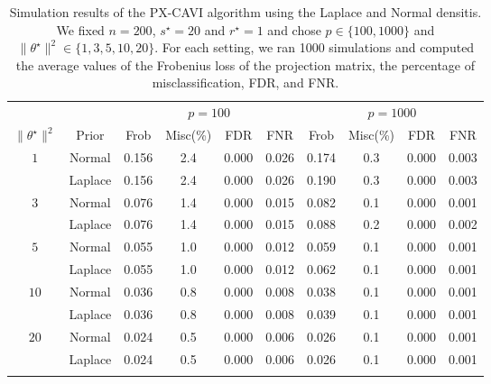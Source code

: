 \documentclass[pdftex, noinfoline, letter]{imsart}
\theoremstyle{plain}
\begin{document}
\begin{table}[h!]
\begin{adjustwidth}{-.1in}{-.1in}  
\centering
\caption{\small Simulation results of the PX-CAVI algorithm using the Laplace and Normal densitis. We fixed $n = 200$, $s^\star = 20$ and $r^\star = 1$ and chose $p \in \{100, 1000\}$ and $\|\theta^\star\|^2 \in \{1, 3, 5, 10, 20\}$. For each setting, we ran 1000 simulations and computed the average values of the Frobenius loss of the projection matrix, the percentage of misclassification, FDR, and FNR.}
\label{sim-1}
{ \small
\begin{tabular}{cc|cccc||cccc}
\Xhline{2\arrayrulewidth}
 &  & \multicolumn{4}{c||}{$p = 100$} & \multicolumn{4}{c}{$p = 1000$} 
\\\Xhline{2\arrayrulewidth}
$\|\theta^\star\|^2$ & Prior & Frob & Misc(\%) & FDR & FNR & Frob & Misc(\%) & FDR & FNR \\ \hline
\multirow{2}{*}{$1$} & Normal & 0.156 & 2.4 & 0.000 & 0.026 & 0.174 & 0.3 & 0.000 & 0.003\\
                           & Laplace & 0.156 & 2.4 & 0.000 & 0.026 & 0.190 & 0.3 & 0.000 & 0.003\\ \hline
\multirow{2}{*}{$3$} & Normal & 0.076 & 1.4 & 0.000 & 0.015 & 0.082 & 0.1 & 0.000 & 0.001\\
                           & Laplace & 0.076 & 1.4 & 0.000 & 0.015 & 0.088 & 0.2 & 0.000 & 0.002\\ \hline
\multirow{2}{*}{$5$} & Normal & 0.055 & 1.0 & 0.000 & 0.012 & 0.059 & 0.1 & 0.000 & 0.001\\
                           & Laplace & 0.055 & 1.0 & 0.000 & 0.012 & 0.062 & 0.1 & 0.000 & 0.001\\ \hline
\multirow{2}{*}{$10$} & Normal & 0.036 & 0.8 & 0.000 & 0.008 & 0.038 & 0.1 & 0.000 & 0.001\\
                             & Laplace & 0.036 & 0.8 & 0.000 & 0.008 & 0.039 & 0.1 & 0.000 & 0.001\\ \hline
\multirow{2}{*}{$20$} & Normal & 0.024 & 0.5 & 0.000 & 0.006 & 0.026 & 0.1 & 0.000 & 0.001\\
                            & Laplace & 0.024 & 0.5 & 0.000 & 0.006 & 0.026 & 0.1 & 0.000 & 0.001\\ \hline
\Xhline{2\arrayrulewidth}    
\end{tabular}  
}
\end{adjustwidth}
\end{table}
\end{document}
